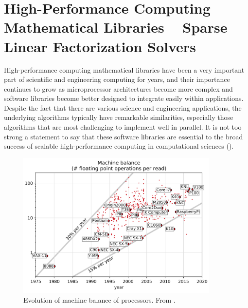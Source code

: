 
\section[Sparse Linear Factorization Solvers]{High-Performance Computing Mathematical Libraries -- Sparse Linear Factorization Solvers}
\label{sec:sparse-solvers}
High-performance  computing mathematical libraries have been a very important part of scientific and engineering computing for years, and their importance continues to grow as microprocessor architectures become more complex and software libraries become better designed to integrate easily within applications. Despite the fact that there are various science and engineering applications, the underlying algorithms typically have remarkable similarities, especially those algorithms that are most challenging to implement well in parallel. It is not too strong a statement to say that these software libraries are essential to the broad success of scalable high-performance computing in computational sciences (\cite{kothe-2007,pitac-2005,bader-2007}).

\begin{figure}[t]
  \centering
  \includegraphics[width=0.9\textwidth]{images/machine-balance-evolution.png}
  \caption{Evolution of machine balance of processors. From \cite{mark-gates-balance}.}
  \label{fig:machine-balance-evolution}
\end{figure}

